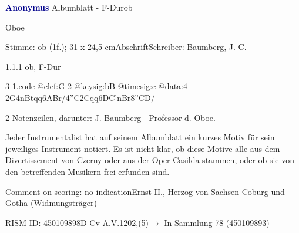 \documentclass[a4paper, twocolumn, 11pt]{book}
\begin{document}
\par \vspace{16pt} \textcolor{darkblue}{\textbf{Anonymus  }}\hfillplus{[3]}\newline Albumblatt - F-Dur\newline ob
\par \begin{itshape}[heading:] Oboe\end{itshape} 
\par \textcolor{darkblue}{}  Stimme: ob  (1f.); 31 x 24,5 cm\newline Abschrift\newline Schreiber: Baumberg, J. C.
\par 1.1.1  ob, F-Dur  
\begin{filecontents*}{3-1.code}
@clef:G-2
@keysig:bB
@timesig:c
@data:4-2G4nBtqq{6AB}r/4''C2Cqq{6DC'nB}r{8''CD}/
\end{filecontents*}
\newline %
\par 2 Notenzeilen, darunter: J. Baumberg | Professor d. Oboe.
\par Jeder Instrumentalist hat auf seinem Albumblatt ein kurzes Motiv für sein jeweiliges Instrument notiert. Es ist nicht klar, ob diese Motive alle aus dem {\textquotedbl}Divertissement{\textquotedbl} von Czerny oder aus der Oper {\textquotedbl}Casilda{\textquotedbl} stammen, oder ob sie von den betreffenden Musikern frei erfunden sind.
\par Comment on scoring: no indication\newline Ernst II., Herzog von Sachsen-Coburg und Gotha  (Widmungsträger)
\par RISM-ID: 450109898\newline D-Cv  A.V.1202,(5)\newline $\rightarrow$ In Sammlung 78 (450109893)
      
\end{document}
